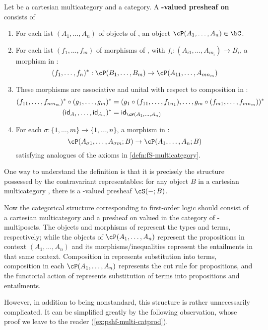 \begin{defn}
  Let \cS be a cartesian multicategory and \bC a category.
  A \textbf{\bC-valued presheaf on \cS} consists of
  \begin{enumerate}
  \item For each list $(A_1,\dots,A_n)$ of objects of \cS, an object $\cP(A_1,\dots,A_n)\in\bC$.
  \item For each list $(f_1,\dots,f_m)$ of morphisms of \cS, with $f_i:(A_{i1},\dots,A_{in_i})\to B_i$, a morphism in \bC:
    \[ (f_1,\dots,f_n)^* : \cP(B_1,\dots,B_m) \to \cP(A_{11},\dots,A_{mn_m}) \]
  \item These morphisms are associative and unital with respect to composition in \cS:
    \begin{align*}
      (f_{11},\dots,f_{mn_m})^* \circ (g_1,\dots,g_m)^* &=
      (g_1\circ (f_{11},\dots,f_{1n_1}), \dots, g_m \circ (f_{m1},\dots,f_{mn_m}))^*
      \\
      (\idfunc_{A_1},\dots,\idfunc_{A_n})^* &= \idfunc_{\cP(A_1,\dots,A_n)}
    \end{align*}
  \item For each $\sigma : \{1,\dots,m\} \to \{1,\dots,n\}$, a morphism in \bC:
    \[ \cP(A_{\sigma 1},\dots,A_{\sigma m}; B) \to \cP(A_1,\dots,A_n;B) \]
    satisfying analogues of the axioms in \cref{defn:fS-multicategory}.
  \end{enumerate}
\end{defn}

One way to understand the definition is that it is precisely the structure possessed by the contravariant representables: for any object $B$ in a cartesian multicategory \cS, there is a \bSet-valued presheaf $\cS(-;B)$.

Now the categorical structure corresponding to first-order logic should consist of a cartesian multicategory \bS and a presheaf \cP on \bS valued in the category of \fS-multiposets.
The objects and morphisms of \cS represent the types and terms, respectively; while
the objects of $\cP(A_1,\dots,A_n)$ represent the propositions in context $(A_1,\dots,A_n)$ and its morphisms/inequalities represent the entailments in that same context.
Composition in \cS represents substitution into terms, composition in each $\cP(A_1,\dots,A_n)$ represents the cut rule for propositions, and the functorial action of \cP represents substitution of terms into propositions and entailments.

However, in addition to being nonstandard, this structure is rather unnecessarily complicated.
It can be simplified greatly by the following observation, whose proof we leave to the reader (\cref{ex:pshf-multi-catprod}).

